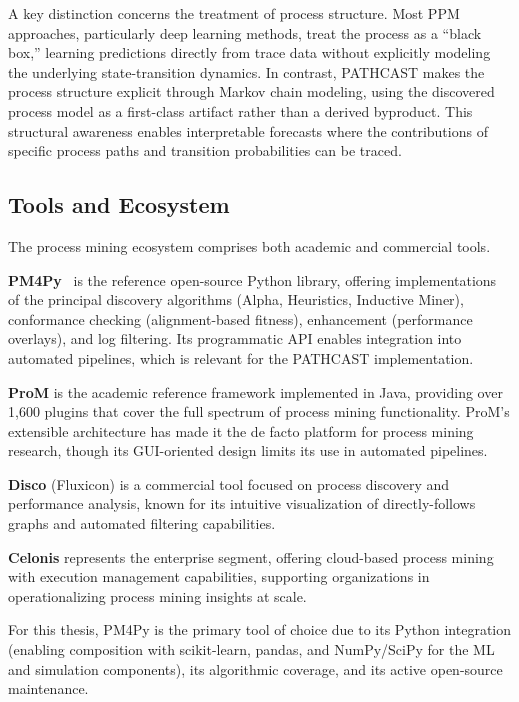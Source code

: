 A key distinction concerns the treatment of process structure. Most
PPM approaches, particularly deep learning methods, treat the process
as a ``black box,'' learning predictions directly from trace data without
explicitly modeling the underlying state-transition dynamics. In contrast,
PATHCAST makes the process structure explicit through Markov chain
modeling, using the discovered process model as a first-class artifact
rather than a derived byproduct. This structural awareness enables
interpretable forecasts where the contributions of specific process paths
and transition probabilities can be traced.


\subsection{Tools and Ecosystem}
\label{sec:pm-tools}

The process mining ecosystem comprises both academic and commercial tools.

\textbf{PM4Py}~\cite{berti2023pm4py} is the reference open-source
Python library, offering implementations of the principal discovery
algorithms (Alpha, Heuristics, Inductive Miner), conformance checking
(alignment-based fitness), enhancement (performance overlays), and log
filtering. Its programmatic API enables integration into automated
pipelines, which is relevant for the PATHCAST implementation.

\textbf{ProM} is the academic reference framework implemented in Java,
providing over 1,600 plugins that cover the full spectrum of process mining
functionality. ProM's extensible architecture has made it the de facto
platform for process mining research, though its GUI-oriented design
limits its use in automated pipelines.

\textbf{Disco} (Fluxicon) is a commercial tool focused on process
discovery and performance analysis, known for its intuitive visualization
of directly-follows graphs and automated filtering capabilities.

\textbf{Celonis} represents the enterprise segment, offering cloud-based
process mining with execution management capabilities, supporting
organizations in operationalizing process mining insights at scale.

For this thesis, PM4Py is the primary tool of choice due to its Python
integration (enabling composition with scikit-learn, pandas, and
NumPy/SciPy for the ML and simulation components), its algorithmic
coverage, and its active open-source maintenance.

